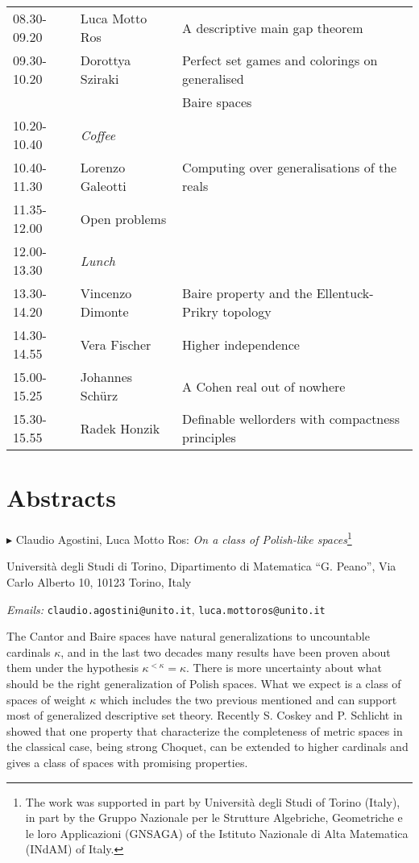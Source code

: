 \documentclass[a4paper]{amsart}
\theoremstyle{remark}
\begin{document}
\begin{tabular} 
{ l | l | l}
08.30-09.20  & Luca Motto Ros  \hspace{15pt} & A descriptive main gap theorem \\ 
09.30-10.20  & Dorottya Sziraki & Perfect set games and colorings on generalised \\ 
& & Baire spaces \\ 
10.20-10.40 & \emph{Coffee} \\ 
10.40-11.30  & Lorenzo Galeotti & Computing over generalisations of the reals \\ 
11.35-12.00  & Open problems & \\ 
12.00-13.30  & \emph{Lunch} \\ 
13.30-14.20  & Vincenzo Dimonte & Baire property and the Ellentuck-Prikry topology \\ 
14.30-14.55  & Vera Fischer & Higher independence \\ 
15.00-15.25  & Johannes Sch\"urz & A Cohen real out of nowhere \\ 
15.30-15.55  & Radek Honzik & Definable wellorders with compactness principles \\ 
\end{tabular} 




\newpage 

\section*{Abstracts} 





\bigskip 
\noindent 
$\blacktriangleright$ Claudio Agostini, Luca Motto Ros: \emph{On a class of Polish-like spaces}\footnote{The work was supported in part by 
Universit\`a degli Studi of Torino (Italy), in part by the Gruppo Nazionale per le Strutture Algebriche, Geometriche e le loro Applicazioni (GNSAGA) of the Istituto Nazionale di Alta Matematica (INdAM) of Italy.}

\noindent 
Universit\`a degli Studi di Torino, Dipartimento di Matematica ``G. Peano'', Via Carlo Alberto 10, 10123 Torino, Italy

\noindent 
\emph{Emails:} \texttt{claudio.agostini@unito.it}, \texttt{luca.mottoros@unito.it}

The Cantor and Baire spaces have natural generalizations to uncountable cardinals $\kappa$, and in the last two decades many results have been proven about them under the hypothesis $\kappa^{<\kappa}=\kappa$. There is more uncertainty about what should be the right generalization of Polish spaces. What we expect is a class of spaces of weight $\kappa$ which includes the two previous mentioned and can support most of generalized descriptive set theory.
Recently S. Coskey and P. Schlicht in \cite{CosSch} showed that one property that characterize the completeness of metric spaces in the classical case, being strong Choquet, can be extended to higher cardinals and gives a class of spaces with promising properties. 
\end{document}
